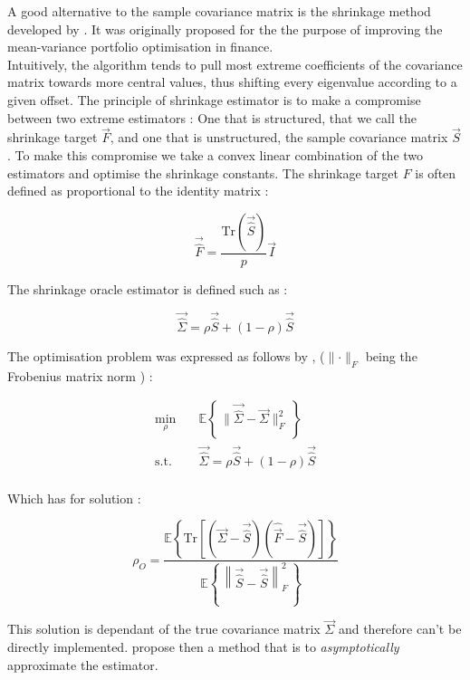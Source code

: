 A good alternative to the sample covariance matrix is the shrinkage method developed by \citet{ledoit_improved_2003}. It was originally proposed for the the purpose of improving the mean-variance portfolio optimisation in finance. \\

Intuitively, the algorithm tends to pull most extreme coefficients of the covariance matrix towards more central values, thus shifting every eigenvalue according to a given offset. The principle of shrinkage estimator is to make a compromise between two extreme estimators : One that is structured, that we call the shrinkage target $\vec{F}$, and one that is unstructured, the sample covariance matrix  $\vec{S}$. To make this compromise we take a  convex linear combination of the two estimators and optimise the shrinkage constants. The shrinkage target $F$ is often defined as proportional to the identity matrix \citet{chen_shrinkage_2010} : 

\begin{equation}
	\vec{\hat{F}} = \frac{\text{Tr}(\vec{\hat{S}})}{p} \vec{I}
\end{equation}

The shrinkage oracle estimator is defined such as :

\begin{equation}
	\vec{\hat{\Sigma}} = \rho\vec{\hat{S}} + (1- \rho )\vec{\hat{S}}
	\label{equ:oracle}
\end{equation}

The optimisation problem was expressed as follows by \citet{ledoit_well-conditioned_2004}, ($\lVert  \cdot \rVert_F$ being the Frobenius matrix norm ) :

\begin{align}
	\min_\rho \quad & \mathbb{E}\left\{ \, \lVert \vec{\hat{\Sigma}} - \vec{\Sigma} \rVert_F^2 \, \right\} \\
	\text{s.t.} \quad &  \vec{\hat{\Sigma}} = \rho\vec{\hat{S}} + (1- \rho )\vec{\hat{S}} \\
\end{align}

Which has for solution : 

\begin{equation}
	\rho_O = \frac{\mathbb{E}\left\{\text{Tr}[(\vec{\Sigma} -\vec{\hat{S}} ) (\hat{\vec{F}} -\vec{\hat{S}} )]\right\}}{\mathbb{E}\left\{ \, \left\lVert \vec{\hat{S}} -\vec{\hat{S}} \right\rVert_F^2 \, \right\}}
\end{equation}


This solution is dependant of the true covariance matrix $\vec{\Sigma}$ and therefore can't be directly implemented. \citet{ledoit_well-conditioned_2004} propose then a method that is to \textit{asymptotically} approximate the estimator. 

